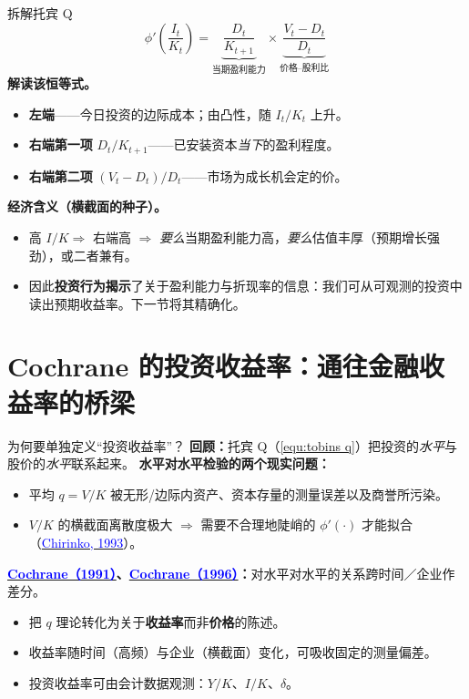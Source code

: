 \documentclass{beamer}
\begin{document}
\begin{frame}{拆解托宾 Q}
	\begin{equation*}
		\phi'\!\left(\frac{I_t}{K_t}\right)=\underbrace{\frac{D_t}{K_{t+1}}}_{\text{当期盈利能力}}\times\underbrace{\frac{V_t-D_t}{D_t}}_{\text{价格--股利比}}
	\end{equation*}
	\textbf{解读该恒等式。}
	\begin{itemize}
		\item \textbf{左端}——今日投资的边际成本；由凸性，随 $I_t/K_t$ 上升。
		\item \textbf{右端第一项} $D_t/K_{t+1}$——已安装资本\textit{当下}的盈利程度。
		\item \textbf{右端第二项} $(V_t-D_t)/D_t$——市场为成长机会定的价。
	\end{itemize}
	\vspace{2pt}
	\textbf{经济含义（横截面的种子）。}
	\begin{itemize}
		\item 高 $I/K \Rightarrow$ 右端高 $\Rightarrow$ \textit{要么}当期盈利能力高，\textit{要么}估值丰厚（预期增长强劲），或二者兼有。
		\item 因此\textbf{投资行为揭示}了关于盈利能力与折现率的信息：我们可从可观测的投资中读出预期收益率。下一节将其精确化。
	\end{itemize}
\end{frame}

\section{Cochrane 的投资收益率：通往金融收益率的桥梁}

\begin{frame}{为何要单独定义“投资收益率”？}
    \textbf{回顾：}托宾 Q（\ref{equ:tobins q}）把投资的\textit{水平}与股价的\textit{水平}联系起来。
    \vspace{0.2cm}
    \textbf{水平对水平检验的两个现实问题：}
    \begin{itemize}
        \item 平均 $q = V/K$ 被无形/边际内资产、资本存量的测量误差以及商誉所污染。
        \item $V/K$ 的横截面离散度极大 $\Rightarrow$ 需要不合理地陡峭的 $\phi'(\cdot)$ 才能拟合（\href{https://doi.org/10.1016/0165-1889(93)90022-K}{\textcolor{blue}{Chirinko, 1993}}）。
    \end{itemize}

    \vspace{0.2cm}
    \textbf{\href{https://doi.org/10.1111/j.1540-6261.1991.tb03750.x}{\textcolor{blue}{Cochrane（1991）}}、\href{https://doi.org/10.1086/262034}{\textcolor{blue}{Cochrane（1996）}}：}对水平对水平的关系跨时间／企业作差分。
    \begin{itemize}
        \item 把 $q$ 理论转化为关于\textbf{收益率}而非\textbf{价格}的陈述。
        \item 收益率随时间（高频）与企业（横截面）变化，可吸收固定的测量偏差。
        \item 投资收益率可由会计数据观测：$Y/K$、$I/K$、$\delta$。
    \end{itemize}
\end{frame}
\end{document}
